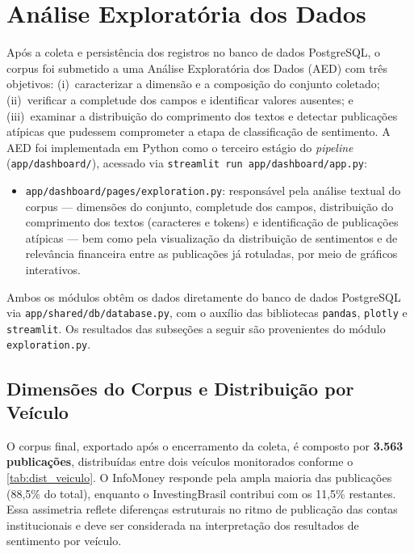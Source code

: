 
\section{Análise Exploratória dos Dados}
\label{sec:eda}

Após a coleta e persistência dos registros no banco de dados PostgreSQL, o corpus foi submetido a uma Análise Exploratória dos Dados (AED) com três objetivos: (i)~caracterizar a dimensão e a composição do conjunto coletado; (ii)~verificar a completude dos campos e identificar valores ausentes; e (iii)~examinar a distribuição do comprimento dos textos e detectar publicações atípicas que pudessem comprometer a etapa de classificação de sentimento. A AED foi implementada em Python como o terceiro estágio do \textit{pipeline} (\texttt{app/dashboard/}), acessado via \texttt{streamlit run app/dashboard/app.py}:

\begin{itemize}
	\item \texttt{app/dashboard/pages/exploration.py}: responsável pela análise textual do corpus --- dimensões do conjunto, completude dos campos, distribuição do comprimento dos textos (caracteres e tokens) e identificação de publicações atípicas --- bem como pela visualização da distribuição de sentimentos e de relevância financeira entre as publicações já rotuladas, por meio de gráficos interativos.
\end{itemize}

Ambos os módulos obtêm os dados diretamente do banco de dados PostgreSQL via \texttt{app/shared/db/database.py}, com o auxílio das bibliotecas \texttt{pandas}, \texttt{plotly} e \texttt{streamlit}. Os resultados das subseções a seguir são provenientes do módulo \texttt{exploration.py}.


\subsection{Dimensões do Corpus e Distribuição por Veículo}
\label{subsec:dimensoes}

O corpus final, exportado após o encerramento da coleta, é composto por \textbf{3.563 publicações}, distribuídas entre dois veículos monitorados conforme o \autoref{tab:dist_veiculo}. O InfoMoney responde pela ampla maioria das publicações (88,5\% do total), enquanto o InvestingBrasil contribui com os 11,5\% restantes. Essa assimetria reflete diferenças estruturais no ritmo de publicação das contas institucionais e deve ser considerada na interpretação dos resultados de sentimento por veículo.

